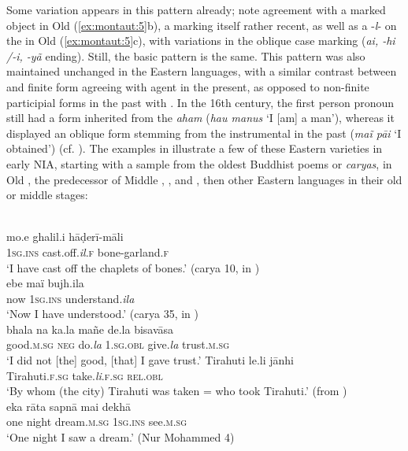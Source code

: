 \documentclass[output=paper]{langsci/langscibook}
\begin{document}
Some variation appears in this pattern already; note agreement with a marked object in Old  (\ref{ex:montaut:5}b), a marking itself rather recent, as well as a -\textit{l}{}-  on the   in Old  (\ref{ex:montaut:5}c), with variations in the oblique case marking (\textit{ai, -hi /-i, -yã} ending). Still, the basic pattern is the same. 
  This pattern was also maintained unchanged in the Eastern languages, with a similar contrast between  and finite form agreeing with agent in the present, as opposed to non-finite participial forms in the past with . In the 16th century, the  first person pronoun still had a  form inherited from the   \textit{aham} (\textit{hau manus} ‘I [am] a man’), whereas it displayed an oblique form stemming from the  instrumental in the past (\textit{maĩ pāi} ‘I obtained’) (cf. \citealt[158]{Tiwari1966}).
  The examples in  illustrate a few of these Eastern varieties in early NIA, starting with a sample from the oldest Buddhist poems or \textit{caryas}, in Old  \citep{Chatterji1926}, the predecessor of Middle , ,  and , then other Eastern languages in their old or middle stages:

\ea
\label{ex:montaut:6}
\ea 
{}\\
\gll mo.e  ghalil.i  hāḍerī-māli\\
 \textsc{1sg.ins}   cast.off.\textit{il}.\textsc{f}   bone-garland.\textsc{f}  \\
\glt ‘I have cast off the chaplets of bones.’  (carya 10, in \citealt[964]{Chatterji1926})
\ex 
{}\\
\gll ebe    maï   bujh.ila\\
now  \textsc{1sg.ins} understand.\textit{ila} \\
\glt ‘Now I have understood.’  (carya 35, in \citealt[964]{Chatterji1926})
\ex 
{}\\
\gll bhala  na  ka.la  mañe  de.la      bisavāsa\\
 good.\textsc{m.sg}    \textsc{neg}    do.\textit{la}   \textsc{1.sg.obl}   give.\textit{la}  trust.\textsc{m.sg} \\
\glt ‘I did not [the] good, [that] I gave trust.’ 
\ex 
\gll Tirahuti    le.li    jānhi\\
Tirahuti.\textsc{f.sg}   take.\textit{li}.\textsc{f.sg}   \textsc{rel.obl} \\ 
\glt ‘By whom (the city) Tirahuti was taken = who took Tirahuti.’ (from \citealt[491]{Jha1958}) 
 \ex 
{}\\
\gll eka  rāta sapnā mai  dekhā\\
one  night    dream.\textsc{m.sg}    \textsc{1sg.ins}    see.\textsc{m.sg}  \\      
\glt ‘One night I saw a dream.’ (Nur Mohammed 4)
\z 
\z 
\end{document}
